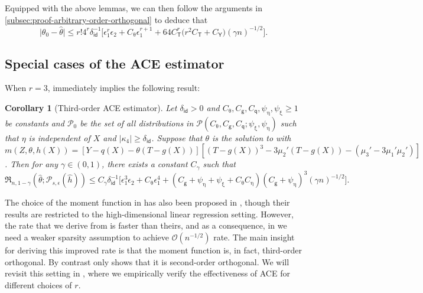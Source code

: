\documentclass{article}
\def\eps{{\epsilon}}
\def\gO{{\mathcal{O}}}
\def\gP{{\mathcal{P}}}
\newtheorem{corollary}{Corollary}[section]
\begin{document}
Equipped with the above lemmas, we can then follow the arguments in \cref{subsec:proof-arbitrary-order-orthogonal} to deduce that
$$\big|\theta_0-\hat{\theta}\big| \leq r!4^r \delta_{\mathsf{id}}^{-1}\Big[ \eps_1^{r}\eps_2 + C_{\uptheta}\eps_1^{r+1} + 64C_{\mathsf{T}}^r\big(r^2C_{\mathsf{T}}+C_{\mathsf{Y}}\big) (\gamma n)^{-1/2} \Big].$$

\subsection{Special cases of the ACE estimator}
\label{subsec:hocein-examples}
When $r=3$,  immediately implies the following result:


\begin{corollary}[Third-order ACE estimator]
    \label{cor:third-order-structure-agnostic}
    Let $\delta_{\mathsf{id}}>0$ and $C_{\uptheta}, C_{\mathsf{g}}, C_{\mathsf{q}}, \psi_{\upeta}, \psi_{\upxi} \geq 1$ be constants and $\gP_0$ be the set of all distributions in $\gP(C_{\uptheta}, C_{\mathsf{g}}, C_{\mathsf{q}}; \psi_{\upxi}, \psi_{\upeta})$ such that $\eta$ is independent of $X$ and $|\kappa_4|\geq \delta_{\mathsf{id}}$. Suppose that $\theta$ is the solution to  with $m(Z,\theta,h(X)) = \left[Y-q(X)-\theta\left(T-g(X)\right)\right]\left[ (T-g(X))^3 - 3\mu_2'(T-g(X)) - (\mu_3'-3\mu_1'\mu_2') \right]$. Then for any $\gamma\in(0,1)$, there exists a constant $C_{\gamma}$ such that
    $$\mathfrak{R}_{n,1-\gamma} (\hat{\theta};\gP_{s,\eps}(\hat{h})) \leq C_{\gamma}\delta_{\mathsf{id}}^{-1}\big[ \eps_1^3\eps_2 + C_{\uptheta} \eps_1^4 + (C_{\mathsf{g}}+\psi_{\upeta}+\psi_{\upxi}+C_{\uptheta}C_{\upeta}) (C_{\mathsf{g}}+\psi_{\upeta})^3 (\gamma n)^{-1/2} \big].$$
\end{corollary}


%

The choice of the moment function in  has also been proposed in \citet{mackey2018orthogonal}, though their results are restricted to the high-dimensional linear regression setting. However, the rate that we  derive from  is faster than theirs, and as a consequence, in  we need a weaker sparsity assumption to achieve $\gO(n^{-1/2})$ rate. The main insight for deriving this improved rate is that the moment function is, in fact, third-order orthogonal. By contrast \citet{mackey2018orthogonal} only shows that it is second-order orthogonal. We will revisit this setting in , where we empirically verify the effectiveness of ACE for different choices of $r$.
\\
\end{document}
